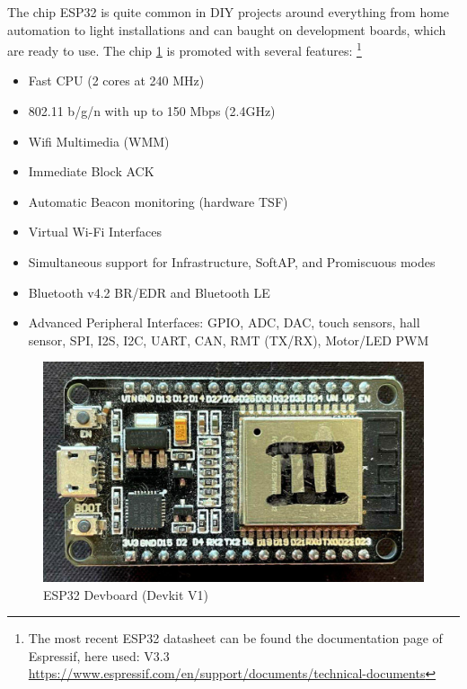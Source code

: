 The chip ESP32 is quite common in DIY projects around everything from home automation to light installations 
and can baught on development boards, which are ready to use.
The chip \ref{fig:esp32} is promoted with several features: 
\footnote{The most recent ESP32 datasheet can be found the documentation page of Espressif, here used: V3.3\\
	\url{https://www.espressif.com/en/support/documents/technical-documents}}
\begin{itemize}
	\setlength\itemsep{-0.0em}
	\item Fast CPU (2 cores at 240 MHz)
	\item 802.11 b/g/n with up to 150 Mbps (2.4GHz)
	\item Wifi Multimedia (WMM)
	\item Immediate Block ACK
	\item Automatic Beacon monitoring (hardware TSF)
	\item Virtual Wi-Fi Interfaces
	\item Simultaneous support for Infrastructure, SoftAP, and Promiscuous modes
	\item Bluetooth v4.2 BR/EDR and Bluetooth LE
	\item Advanced Peripheral Interfaces: GPIO, ADC, DAC, touch sensors, hall sensor, 
	SPI, I2S, I2C, UART, CAN, RMT (TX/RX), Motor/LED PWM 
\end{itemize}

\begin{figure}[h]
	\centering
	\includegraphics[scale=0.2]{figures/espdevboard.jpg}
	\caption{ESP32 Devboard (Devkit V1)}
	\label{fig:esp32}%
\end{figure}


